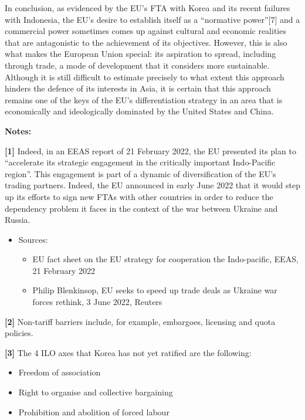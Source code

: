 \documentclass[11pt,a4paper]{article}
\begin{document}
In conclusion, as evidenced by the EU’s FTA with Korea and its recent failures with Indonesia, the EU’s desire to establish itself as a “normative power”{[}7{]} and a commercial power sometimes comes up against cultural and economic realities that are antagonistic to the achievement of its objectives. However, this is also what makes the European Union special: its aspiration to spread, including through trade, a mode of development that it considers more sustainable. Although it is still difficult to estimate precisely to what extent this approach hinders the defence of its interests in Asia, it is certain that this approach remains one of the keys of the EU’s differentiation strategy in an area that is economically and ideologically dominated by the United States and China.

\textbf{Notes:}

\textbf{{[}1{]}} Indeed, in an EEAS report of 21 February 2022, the EU presented its plan to “accelerate its strategic engagement in the critically important Indo-Pacific region”. This engagement is part of a dynamic of diversification of the EU’s trading partners. Indeed, the EU announced in early June 2022 that it would step up its efforts to sign new FTAs with other countries in order to reduce the dependency problem it faces in the context of the war between Ukraine and Russia.
\begin{itemize}
  \item Sources:
  \begin{itemize}
    \item EU fact sheet on the EU strategy for cooperation the Indo-pacific, EEAS, 21 February 2022
    \item Philip Blenkinsop, EU seeks to speed up trade deals as Ukraine war forces rethink, 3 June 2022, Reuters
  \end{itemize}
\end{itemize}

\textbf{{[}2{]}} Non-tariff barriers include, for example, embargoes, licensing and quota policies.

\textbf{{[}3{]}} The 4 ILO axes that Korea has not yet ratified are the following:
\begin{itemize}
  \item Freedom of association
  \item Right to organise and collective bargaining
  \item Prohibition and abolition of forced labour
\end{itemize}
\end{document}
